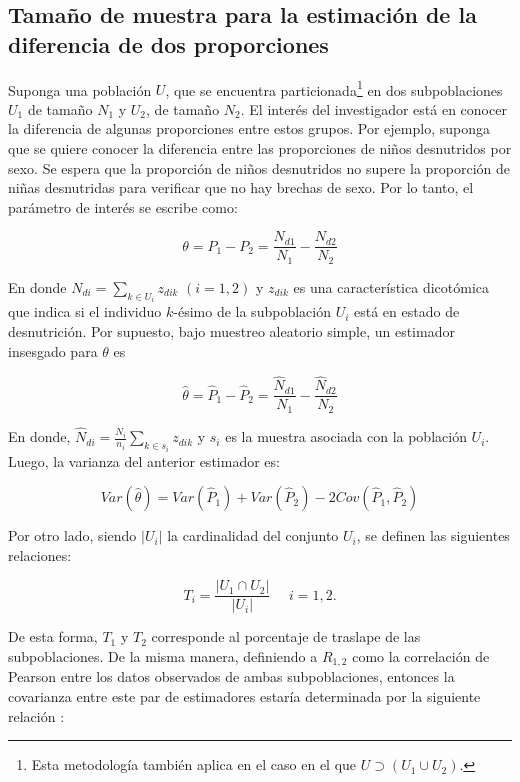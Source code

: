 \documentclass[
  12pt,
  spanish,
]{book}
\begin{document}
\hypertarget{tamauxf1o-de-muestra-para-la-estimaciuxf3n-de-la-diferencia-de-dos-proporciones}{%
\subsection{Tamaño de muestra para la estimación de la diferencia de dos proporciones}\label{tamauxf1o-de-muestra-para-la-estimaciuxf3n-de-la-diferencia-de-dos-proporciones}}

Suponga una población \(U\), que se encuentra particionada\footnote{Esta metodología también aplica en el caso en el que \(U \supset (U_1 \cup U_2)\).} en dos subpoblaciones \(U_1\) de tamaño \(N_1\) y \(U_2\), de tamaño \(N_2\). El interés del investigador está en conocer la diferencia de algunas proporciones entre estos grupos. Por ejemplo, suponga que se quiere conocer la diferencia entre las proporciones de niños desnutridos por sexo. Se espera que la proporción de niños desnutridos no supere la proporción de niñas desnutridas para verificar que no hay brechas de sexo. Por lo tanto, el parámetro de interés se escribe como:

\[
\theta=P_1-P_2=\frac{N_{d1}}{N_1}-\frac{N_{d2}}{N_2}
\]

En donde \(N_{di}=\sum_{k\in U_i}z_{dik}\) \((i=1,2)\) y \(z_{dik}\) es una característica dicotómica que indica si el individuo \(k\)-ésimo de la subpoblación \(U_i\) está en estado de desnutrición. Por supuesto, bajo muestreo aleatorio simple, un estimador insesgado para \(\theta\) es

\[
\hat{\theta}=\hat{P}_1-\hat{P}_2=\frac{\hat{N}_{d1}}{N_1}-\frac{\hat{N}_{d2}}{N_2}
\]

En donde, \(\hat{N}_{di}=\frac{N_i}{n_i}\sum_{k\in s_i}z_{dik}\) y \(s_i\) es la muestra asociada con la población \(U_i\). Luego, la varianza del anterior estimador es:

\[
Var(\hat{\theta})=Var\left(\hat{P}_1\right)+Var\left(\hat{P}_2\right)-2Cov\left(\hat{P}_1, \hat{P}_2\right)
\]

Por otro lado, siendo \(|U_i|\) la cardinalidad del conjunto \(U_i\), se definen las siguientes relaciones:

\[
T_i = \frac{|U_1 \cap U_2|}{|U_i|} \ \ \ \ \ \ i =1, 2. 
\]

De esta forma, \(T_1\) y \(T_2\) corresponde al porcentaje de traslape de las subpoblaciones. De la misma manera, definiendo a \(R_{1,2}\) como la correlación de Pearson entre los datos observados de ambas subpoblaciones, entonces la covarianza entre este par de estimadores estaría determinada por la siguiente relación \citep{Kish_2004}:
\end{document}
